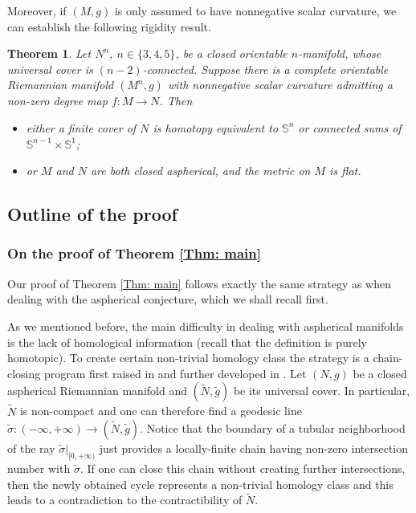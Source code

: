 \documentclass[11pt,letterpaper]{amsart}
\numberwithin{equation}{section}
\newtheorem{theorem}{Theorem}[section]
\theoremstyle{definition}
\begin{document}
Moreover, if $(M,g)$ is only assumed to have nonnegative scalar curvature, we can establish the following rigidity result.
\begin{theorem}\label{Thm: mapping rigidity}
Let $N^n$, $n\in\{3,4,5\}$, be a closed orientable $n$-manifold, whose universal cover is $(n-2)$-connected. Suppose there is a complete orientable Riemannian manifold $(M^n,g)$ with nonnegative scalar curvature admitting a non-zero degree map $f:M\to N$. Then
\begin{itemize}\setlength{\itemsep}{1mm}
    \item either a finite cover of $N$ is homotopy equivalent to $\mathbb{S}^n$ or connected sums of $\mathbb{S}^{n-1} \times \mathbb{S}^1$;
    \item or $M$ and $N$ are both closed aspherical, and the metric on $M$ is flat.
\end{itemize}
\end{theorem}

\subsection{Outline of the proof}
\subsubsection{On the proof of Theorem \ref{Thm: main}}
Our proof of Theorem \ref{Thm: main} follows exactly the same strategy as when dealing with the aspherical conjecture, which we shall recall first.

As we mentioned before, the main difficulty in dealing with aspherical manifolds is the lack of homological information (recall that the definition is purely homotopic). To create certain non-trivial homology class the strategy is a chain-closing program first raised in \cite{SY87} and further developed in \cite{CL20}. Let $(N,g)$ be a closed aspherical Riemannian manifold and $(\tilde N,\tilde g)$ be its universal cover. In particular, $\tilde N$ is non-compact and one can therefore find a geodesic line $\tilde\sigma:(-\infty,+\infty)\to (\tilde N,\tilde g)$. Notice that the boundary of a tubular neighborhood of the ray $\tilde\sigma|_{[0,+\infty)}$ just provides a locally-finite chain having non-zero intersection number with $\tilde\sigma$. If one can close this chain without creating further intersections, then the newly obtained cycle represents a non-trivial homology class and this leads to a contradiction to the contractibility of $\tilde N$.
\end{document}
